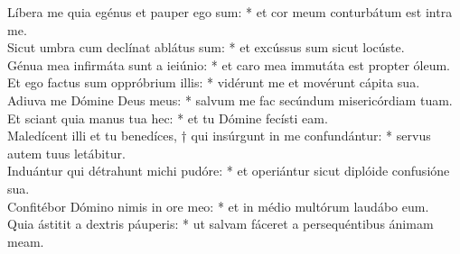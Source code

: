 {	Líbera me quia egénus et pauper ego sum: * et cor meum conturbátum est intra me. \\
	Sicut umbra cum declínat ablátus sum: * et excússus sum sicut locúste. \\
	Génua mea infirmáta sunt a ieiúnio: * et caro mea immutáta est propter óleum. \\
	Et ego factus sum oppróbrium illis: * vidérunt me et movérunt cápita sua. \\
	Adiuva me Dómine Deus meus: * salvum me fac secúndum misericórdiam tuam. \\
	Et sciant quia manus tua hec: * et tu Dómine fecísti eam. \\
	Maledícent illi et tu benedíces, † qui insúrgunt in me confundántur: * servus autem tuus letábitur. \\
	Induántur qui détrahunt michi pudóre: * et operiántur sicut diplóide confusióne sua. \\
	Confitébor Dómino nimis in ore meo: * et in médio multórum laudábo eum. \\
	Quia ástitit a dextris páuperis: * ut salvam fáceret a persequéntibus ánimam meam.
}


